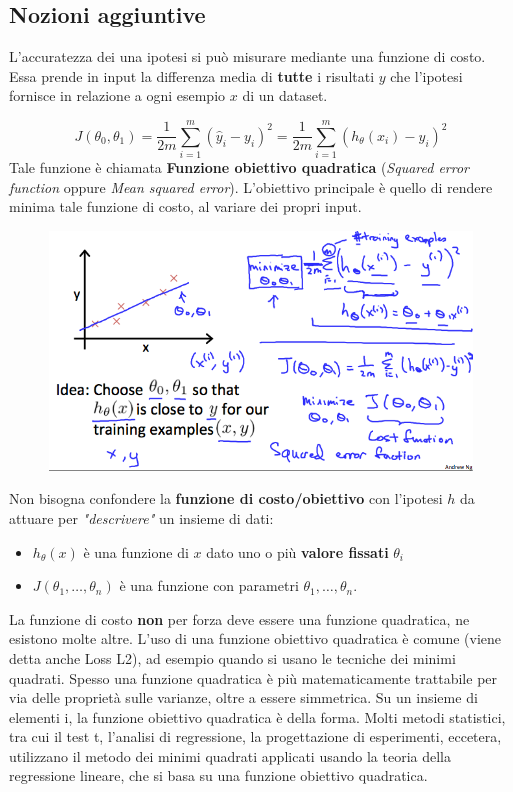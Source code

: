    \subsection{Nozioni aggiuntive}
   L'accuratezza dei una ipotesi si può misurare mediante una funzione di costo. Essa prende in input la differenza media di \textbf{tutte} i risultati $y$ che l'ipotesi fornisce in relazione a ogni esempio $x$ di un dataset.

\[J(\theta_0, \theta_1) = \dfrac {1}{2m} \displaystyle \sum _{i=1}^m \left ( \hat{y}_{i}- y_{i} \right)^2 = \dfrac {1}{2m} \displaystyle \sum _{i=1}^m \left (h_\theta (x_{i}) - y_{i} \right)^2\]
Tale funzione è chiamata \textbf{Funzione obiettivo quadratica} (\textit{Squared error function} oppure \textit{Mean squared error}). L'obiettivo principale è quello di rendere minima tale funzione di costo, al variare dei propri input. 
\begin{figure}[h!]
    \centering
    \includegraphics[width=1\textwidth]{img/R2YF5Lj3EeajLxLfjQiSjg_110c901f58043f995a35b31431935290_Screen-Shot-2016-12-02-at-5.23.31-PM.png}
\end{figure}
\begin{nota}
Non bisogna confondere la \textbf{funzione di costo/obiettivo} con l'ipotesi $h$ da attuare per \textit{"descrivere"} un insieme di dati:
\begin{itemize}
    \item $h_\theta(x)$ è una funzione di $x$ dato uno o più \textbf{valore fissati} $\theta_i$
    \item $J(\theta_1, \dots, \theta_n)$ è una funzione con parametri $\theta_1, \dots, \theta_n$.
\end{itemize}
\end{nota}
\begin{nota}
La funzione di costo \textbf{non} per forza deve essere una funzione quadratica, ne esistono molte altre. L'uso di una funzione obiettivo quadratica è comune (viene detta anche Loss L2), ad esempio quando si usano le tecniche dei minimi quadrati. Spesso una funzione quadratica è più matematicamente trattabile per via delle proprietà sulle varianze, oltre a essere simmetrica. Su un insieme di elementi i, la funzione obiettivo quadratica è della forma.
Molti metodi statistici, tra cui il test t, l'analisi di regressione, la progettazione di esperimenti, eccetera, utilizzano il metodo dei minimi quadrati applicati usando la teoria della regressione lineare, che si basa su una funzione obiettivo quadratica. 
\end{nota}
